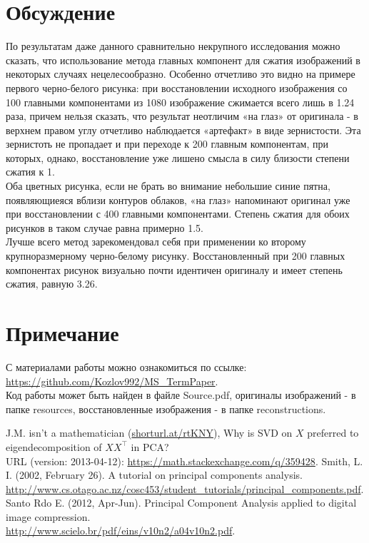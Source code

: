 \documentclass[a4paper]{article}
\begin{document}
\section{Обсуждение}
По результатам даже данного сравнительно некрупного исследования можно сказать, что использование метода главных компонент для сжатия изображений в некоторых случаях нецелесообразно. Особенно отчетливо это видно на примере первого черно-белого рисунка: при восстановлении исходного изображения со 100 главными компонентами из 1080 изображение сжимается всего лишь в 1.24 раза, причем нельзя сказать, что результат неотличим «на глаз» от оригинала - в верхнем правом углу отчетливо наблюдается «артефакт» в виде зернистости. Эта зернистоть не пропадает и при переходе к 200 главным компонентам, при которых, однако, восстановление уже лишено смысла в силу близости степени сжатия к 1.\\
Оба цветных рисунка, если не брать во внимание небольшие синие пятна, появляющиеяся вблизи контуров облаков, «на глаз» напоминают оригинал уже при восстановлении с 400 главными компонентами. Степень сжатия для обоих рисунков в таком случае равна примерно 1.5.\\
Лучше всего метод зарекомендовал себя при применении ко второму крупноразмерному черно-белому рисунку. Восстановленный при 200 главных компонентах рисунок визуально почти идентичен оригиналу и имеет степень сжатия, равную 3.26.
\section*{Примечание}
С материалами работы можно ознакомиться по ссылке: \url{https://github.com/Kozlov992/MS_TermPaper}.\\ Код работы может быть найден в файле Source.pdf, оригиналы изображений - в папке resources, восстановленные изображения - в папке reconstructions.
\begin{thebibliography}{9}
J.M. isn't a mathematician (\url{shorturl.at/rtKNY}), Why is SVD on $X$ preferred to eigendecomposition of $XX^\top$ in PCA?\\URL (version: 2013-04-12): \url{https://math.stackexchange.com/q/359428}.
Smith, L. I. (2002, February 26). A tutorial on principal components analysis.\\
\url{http://www.cs.otago.ac.nz/cosc453/student_tutorials/principal_components.pdf}.
Santo Rdo E. (2012,  Apr-Jun). Principal Component Analysis applied to digital image compression.\\
\url{http://www.scielo.br/pdf/eins/v10n2/a04v10n2.pdf}.
\end{thebibliography}
\end{document}
